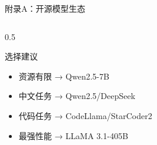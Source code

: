 \documentclass[aspectratio=169,11pt]{beamer}
\begin{document}
\begin{frame}{附录A：开源模型生态}
\begin{columns}
\begin{column}{0.5\textwidth}
            \vspace{0.3cm}
            \begin{exampleblock}{选择建议}
                \small
                \begin{itemize}
                    \item 资源有限 → Qwen2.5-7B
                    \item 中文任务 → Qwen2.5/DeepSeek
                    \item 代码任务 → CodeLlama/StarCoder2
                    \item 最强性能 → LLaMA 3.1-405B
                \end{itemize}
            \end{exampleblock}
        \end{column}
    \end{columns}
\end{frame}
\end{document}
